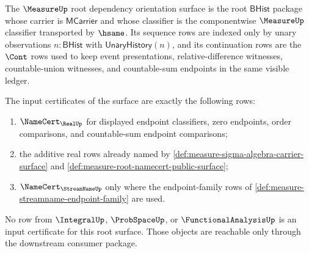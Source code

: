 \begin{definition}
\label{def:measure-root-dependency-orientation-surface}
The $\MeasureUp$ root dependency orientation surface is the root
$\mathsf{BHist}$ package whose carrier is $\mathsf{MCarrier}$ and whose
classifier is the componentwise $\MeasureUp$ classifier transported by
$\hsame$. Its sequence rows are indexed only by unary observations
$n:\mathsf{BHist}$ with $\mathsf{UnaryHistory}(n)$, and its continuation rows
are the $\Cont$ rows used to keep event presentations, relative-difference
witnesses, countable-union witnesses, and countable-sum endpoints in the same
visible ledger.

The input certificates of the surface are exactly the following rows:
\begin{enumerate}
  \item $\NameCert_{\RealUp}$ for displayed endpoint classifiers, zero
  endpoints, order comparisons, and countable-sum endpoint comparisons;
  \item the additive real rows already named by
  \autoref{def:measure-sigma-algebra-carrier-surface} and
  \autoref{def:measure-root-namecert-public-surface};
  \item $\NameCert_{\StreamNameUp}$ only where the endpoint-family rows of
  \autoref{def:measure-streamname-endpoint-family} are used.
\end{enumerate}
No row from $\IntegralUp$, $\ProbSpaceUp$, or $\FunctionalAnalysisUp$ is an
input certificate for this root surface. Those objects are reachable only
through the downstream consumer package.
\end{definition}

